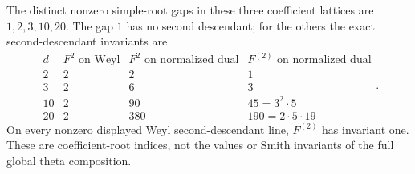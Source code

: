 \documentclass[11pt,a4paper]{article}
\theoremstyle{definition}
\theoremstyle{remark}
\begin{document}
The distinct nonzero simple-root gaps in these three coefficient
lattices are $1,2,3,10,20$. The gap $1$ has no second descendant; for
the others the exact second-descendant invariants are
\[
\begin{array}{c|c|c|c}
 d&F^2\text{ on Weyl}&F^2\text{ on normalized dual}
       &F^{(2)}\text{ on normalized dual}\\\hline
 2&2&2&1\\
 3&2&6&3\\
 10&2&90&45=3^2\cdot5\\
 20&2&380&190=2\cdot5\cdot19
\end{array}.                                                    \tag{IF-11e}
\]
On every nonzero displayed Weyl second-descendant line,
$F^{(2)}$ has invariant one. These are coefficient-root indices,
not the values or Smith invariants of the full global theta composition.
\end{document}
